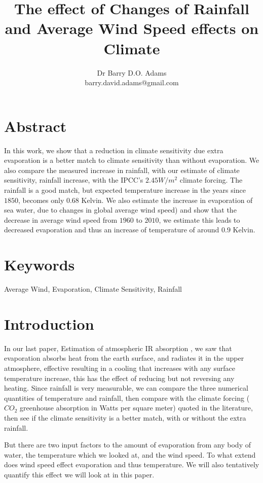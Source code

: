 \documentclass{book}
\begin{document}
	\title{The effect of Changes of Rainfall and Average Wind Speed effects on Climate}
	\author{Dr Barry D.O. Adams \\ barry.david.adams@gmail.com}
	\maketitle
	\section{Abstract}
		In this work, we show that a reduction in climate sensitivity due extra evaporation is a better match to climate sensitivity than without evaporation. We also compare the measured increase in rainfall, with our estimate of climate sensitivity, rainfall increase, with the IPCC's $2.45 W/m^2$ climate forcing. The rainfall is a good match, but expected temperature increase in the years since $1850$, becomes only $0.68 $ Kelvin. We also estimate the increase in evaporation of sea water, due to changes in global average wind speed) and show that the decrease in average wind speed from $1960$ to $2010$, we estimate this leads to decreased evaporation and thus an increase of temperature of around $0.9$ Kelvin.
		
	\section{Keywords} Average Wind, Evaporation, Climate Sensitivity, Rainfall
	
	\section{Introduction}
		In our last paper, Estimation of atmospheric IR absorption \cite{Adams1}, we saw that evaporation absorbs heat from the earth surface, and radiates it in the upper atmosphere,
		effective resulting in a cooling that increases with any surface temperature increase, this has the effect of reducing but not reversing any heating. Since rainfall is very measurable, we can compare the three numerical quantities of temperature and rainfall, then compare with the climate forcing ($CO_2$ greenhouse absorption in Watts per square meter) quoted in the literature, then see if the climate sensitivity is a better match, with or without the extra rainfall.  
		
		But there are two input factors to the
		amount of evaporation from any body of water, the temperature which we looked at, and the wind speed. To what extend does wind speed effect evaporation and thus
		temperature. We will also tentatively quantify this effect we will look at in this paper. 
		
\end{document}
